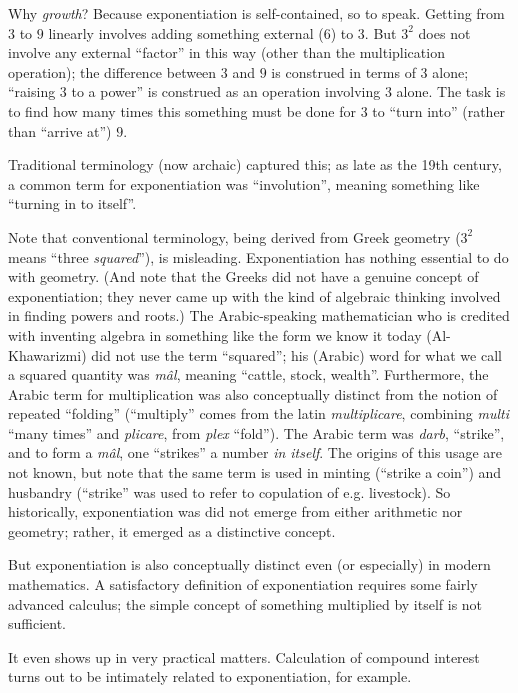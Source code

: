 Why \textit{growth}?  Because exponentiation is self-contained, so to
speak.  Getting from $3$ to $9$ linearly involves adding something
external ($6$) to $3$.  But $3^2$ does not involve any external
``factor'' in this way (other than the multiplication operation); the
difference between $3$ and $9$ is construed in terms of $3$ alone;
``raising $3$ to a power'' is construed as an operation involving $3$
alone.  The task is to find how many times this something must be done
for $3$ to ``turn into'' (rather than ``arrive at'') $9$.

Traditional terminology (now archaic) captured this; as late as the
19th century, a common term for exponentiation was ``involution'',
meaning something like ``turning in to itself''.

Note that conventional terminology, being derived from Greek geometry
($3^2$ means ``three \textit{squared}''), is misleading.
Exponentiation has nothing essential to do with geometry.  (And note
that the Greeks did not have a genuine concept of exponentiation; they
never came up with the kind of algebraic thinking involved in finding
powers and roots.)  The Arabic-speaking mathematician who is credited
with inventing algebra in something like the form we know it today
(Al-Khawarizmi) did not use the term ``squared''; his (Arabic) word
for what we call a squared quantity was \textit{m\^{a}l}, meaning
``cattle, stock, wealth''.  Furthermore, the Arabic term for
multiplication was also conceptually distinct from the notion of
repeated ``folding'' (``multiply'' comes from the latin
\textit{multiplicare}, combining \textit{multi} ``many times'' and
\textit{plicare}, from \textit{plex} ``fold'').  The Arabic term was
\textit{darb}, ``strike'', and to form a \textit{m\^{a}l}, one
``strikes'' a number \textit{in itself}.  The origins of this usage
are not known, but note that the same term is used in minting
(``strike a coin'') and husbandry (``strike'' was used to refer to
copulation of e.g. livestock).  So historically, exponentiation was
did not emerge from either arithmetic nor geometry; rather, it emerged
as a distinctive concept.

But exponentiation is also conceptually distinct even (or especially)
in modern mathematics.  A satisfactory definition of exponentiation
requires some fairly advanced calculus; the simple concept of
something multiplied by itself is not sufficient.

It even shows up in very practical matters.  Calculation of compound
interest turns out to be intimately related to exponentiation, for
example.

